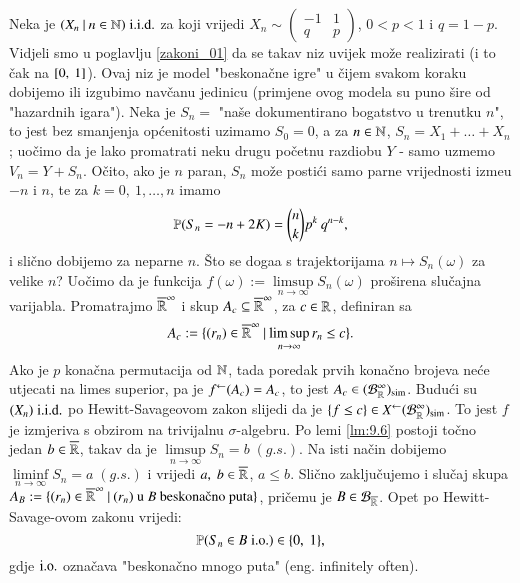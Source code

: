 \begin{pr}
    Neka je $({X_n} \: | \: {n \in \mathbb{N}}) \; \mathrm{i.i.d.}$ za koji vrijedi $X_n \sim \begin{pmatrix} -1 & 1\\ q & p \end{pmatrix}$, $0 < p < 1$ i $q = 1 - p$. Vidjeli smo u poglavlju \ref{zakoni_01} da se takav niz uvijek mo\v ze realizirati (i to \v cak na $[{0}, \:{1}]$).
    Ovaj niz je model "beskona\v cne igre" u \v cijem svakom koraku dobijemo ili izgubimo nav\v canu jedinicu (primjene ovog modela su puno \v sire od "hazardnih igara").
    Neka je $S_n =$ "na\v se dokumentirano bogatstvo u trenutku $n$", to jest bez smanjenja op\' cenitosti uzimamo $S_0 = 0$, a za $n \in \mathbb{N}$, $S_n = X_1 + \ldots + X_n$; uo\v cimo da je lako promatrati neku drugu po\v cetnu razdiobu $Y$ - samo uzmemo $V_n = Y + S_n$.
    O\v cito, ako je $n$ paran, $S_n$ mo\v ze posti\' ci samo parne vrijednosti izme\dj u $-n$ i $n$, te za $k = 0, \: 1, \ldots, n$ imamo
    \begin{equation*}
        \mathbb{P}({S_n = -n + 2K}) = {n \choose k} p^k \: q^{n - k},
    \end{equation*}
    i sli\v cno dobijemo za neparne $n$.
    \v Sto se doga\dj a s trajektorijama $n \mapsto S_n(\omega)$ za velike $n$?
    Uo\v cimo da je funkcija $f(\omega) := \limsup\limits_{n \to \infty} S_n(\omega)$ pro\v sirena slu\v cajna varijabla.
    Promatrajmo $\overline{\mathbb{R}}^{\infty}$ i skup $A_c \subseteq \overline{\mathbb{R}}^\infty$, za $c \in \mathbb{R}$, definiran sa
    \begin{equation*}
        A_c := \{{(r_n) \in \overline{\mathbb{R}}^\infty} \: | \: {\limsup\limits_{n \to \infty} r_n \leq c}\}.
    \end{equation*}
    Ako je $p$ kona\v cna permutacija od $\mathbb{N}$, tada poredak prvih kona\v cno brojeva ne\' ce utjecati na limes superior, pa je ${f}^{\leftarrow} (A_c) = A_c$, to jest $A_c \in (\mathcal{B}_{\mathbb{R}}^\infty)_{\mathrm{sim}}$.
    Budu\' ci su $(X_n) \; \mathrm{i.i.d.}$ po Hewitt-Savageovom zakon slijedi da je $\{f \leq c\} \in {X}^{\leftarrow} (\mathcal{B}_{\mathbb{R}}^\infty)_{\mathrm{sim}}$.
    To jest $f$ je izmjeriva s obzirom na trivijalnu $\sigma$-algebru.
    Po lemi \ref{lm:9.6} postoji to\v cno jedan $b \in \overline{\mathbb{R}}$, takav da je $\limsup\limits_{n \to \infty} S_n = b \; (g.s.)$.
    Na isti na\v cin dobijemo $\liminf\limits_{n \to \infty} S_n = a \; (g.s.)$ i vrijedi $a, \; b \in \overline{\mathbb{R}}$, $a \leq b$.
    Sli\v cno zaklju\v cujemo i slu\v caj skupa $A_B := \skup{(r_n) \in \extReal^\infty}{(r_n) \textnormal{ u $B$ beskona\v cno puta}}$, pri\v cemu je $B \in \mathcal{B}_{\overline{\mathbb{R}}}$. Opet po Hewitt-Savage-ovom zakonu vrijedi:
    \begin{equation*}
        \mathbb{P}({S_n \in B \; \mathrm{i.o.}}) \in \{0, \; 1\},
    \end{equation*}
    gdje $\mathrm{i.o.}$ ozna\v cava "beskona\v cno mnogo puta" (eng. infinitely often).


\end{pr}
